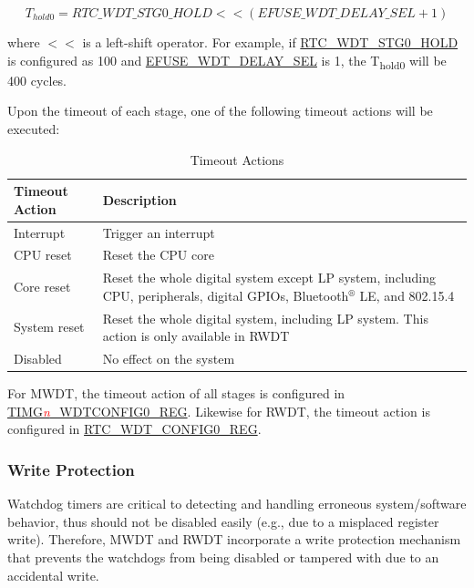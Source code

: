\documentclass[main\_\_EN.tex]{subfiles}
\begin{document}
\begin{displaymath}
T_{hold0} = \hyperref[fielddesc:RTCWDTSTG0HOLD]{RTC\_WDT\_STG0\_HOLD}   << (\hyperref[fielddesc:EFUSEWDTDELAYSEL]{EFUSE\_WDT\_DELAY\_SEL} + 1)
\end{displaymath}

where $<<$ is a left-shift operator. For example, if \hyperref[fielddesc:RTCWDTSTG0HOLD]{RTC\_WDT\_STG0\_HOLD} is configured as 100 and \hyperref[fielddesc:EFUSEWDTDELAYSEL]{EFUSE\_WDT\_DELAY\_SEL} is 1, the T\textsubscript{hold0} will be 400 cycles.

Upon the timeout of each stage, one of the following timeout actions will be executed:

\begin{table}[H]
\centering
\caption{Timeout Actions}
\label{tab:wdt-timeout-action}

\begin{tabular}{|l|m{12cm}|}
\hline
\rowcolor{lightgray}
    \textbf{Timeout Action} & \textbf{Description} \\\hline

    Interrupt &  Trigger an interrupt \\ \hline
    CPU reset &  Reset the CPU core \\ \hline
    Core reset &  Reset the whole digital system except LP system, including CPU, peripherals, digital GPIOs, Bluetooth$^®$ LE, and 802.15.4 \\ \hline
    System reset &  Reset the whole digital system, including LP system. This action is only available in RWDT  \\ \hline
    Disabled &  No effect on the system \\ \hline

\end{tabular}
\end{table}

For MWDT, the timeout action of all stages is configured in \hyperref[regdesc:TIMGWDTCONFIG0REG]{TIMG\textcolor{red}{\it{n}}\_WDTCONFIG0\_REG}. Likewise for RWDT, the timeout action is configured in \hyperref[regdesc:RTCWDTCONFIG0REG]{RTC\_WDT\_CONFIG0\_REG}.

\subsubsection{Write Protection}
Watchdog timers are critical to detecting and handling erroneous system/software behavior, thus should not be disabled easily (e.g., due to a misplaced register write). Therefore, MWDT and RWDT incorporate a write protection mechanism that prevents the watchdogs from being disabled or tampered with due to an accidental write.
\end{document}
